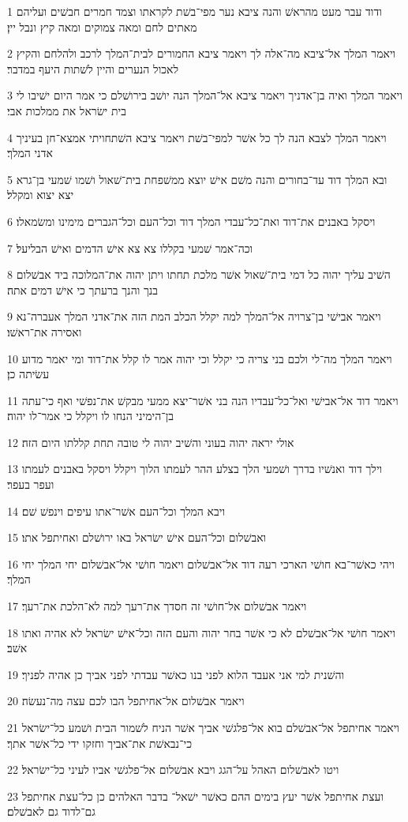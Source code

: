 \par 1 ודוד עבר מעט מהראשׁ והנה ציבא נער מפי־בשׁת לקראתו וצמד חמרים חבשׁים ועליהם מאתים לחם ומאה צמוקים ומאה קיץ ונבל יין׃
\par 2 ויאמר המלך אל־ציבא מה־אלה לך ויאמר ציבא החמורים לבית־המלך לרכב ולהלחם והקיץ לאכול הנערים והיין לשׁתות היעף במדבר׃
\par 3 ויאמר המלך ואיה בן־אדניך ויאמר ציבא אל־המלך הנה יושׁב בירושׁלם כי אמר היום ישׁיבו לי בית ישׂראל את ממלכות אבי׃
\par 4 ויאמר המלך לצבא הנה לך כל אשׁר למפי־בשׁת ויאמר ציבא השׁתחויתי אמצא־חן בעיניך אדני המלך׃
\par 5 ובא המלך דוד עד־בחורים והנה משׁם אישׁ יוצא ממשׁפחת בית־שׁאול ושׁמו שׁמעי בן־גרא יצא יצוא ומקלל׃
\par 6 ויסקל באבנים את־דוד ואת־כל־עבדי המלך דוד וכל־העם וכל־הגברים מימינו ומשׂמאלו׃
\par 7 וכה־אמר שׁמעי בקללו צא צא אישׁ הדמים ואישׁ הבליעל׃
\par 8 השׁיב עליך יהוה כל דמי בית־שׁאול אשׁר מלכת תחתו ויתן יהוה את־המלוכה ביד אבשׁלום בנך והנך ברעתך כי אישׁ דמים אתה׃
\par 9 ויאמר אבישׁי בן־צרויה אל־המלך למה יקלל הכלב המת הזה את־אדני המלך אעברה־נא ואסירה את־ראשׁו׃
\par 10 ויאמר המלך מה־לי ולכם בני צריה כי יקלל וכי יהוה אמר לו קלל את־דוד ומי יאמר מדוע עשׂיתה כן׃
\par 11 ויאמר דוד אל־אבישׁי ואל־כל־עבדיו הנה בני אשׁר־יצא ממעי מבקשׁ את־נפשׁי ואף כי־עתה בן־הימיני הנחו לו ויקלל כי אמר־לו יהוה׃
\par 12 אולי יראה יהוה בעוני והשׁיב יהוה לי טובה תחת קללתו היום הזה׃
\par 13 וילך דוד ואנשׁיו בדרך ושׁמעי הלך בצלע ההר לעמתו הלוך ויקלל ויסקל באבנים לעמתו ועפר בעפר׃
\par 14 ויבא המלך וכל־העם אשׁר־אתו עיפים וינפשׁ שׁם׃
\par 15 ואבשׁלום וכל־העם אישׁ ישׂראל באו ירושׁלם ואחיתפל אתו׃
\par 16 ויהי כאשׁר־בא חושׁי הארכי רעה דוד אל־אבשׁלום ויאמר חושׁי אל־אבשׁלום יחי המלך יחי המלך׃
\par 17 ויאמר אבשׁלום אל־חושׁי זה חסדך את־רעך למה לא־הלכת את־רעך׃
\par 18 ויאמר חושׁי אל־אבשׁלם לא כי אשׁר בחר יהוה והעם הזה וכל־אישׁ ישׂראל לא אהיה ואתו אשׁב׃
\par 19 והשׁנית למי אני אעבד הלוא לפני בנו כאשׁר עבדתי לפני אביך כן אהיה לפניך׃
\par 20 ויאמר אבשׁלום אל־אחיתפל הבו לכם עצה מה־נעשׂה׃
\par 21 ויאמר אחיתפל אל־אבשׁלם בוא אל־פלגשׁי אביך אשׁר הניח לשׁמור הבית ושׁמע כל־ישׂראל כי־נבאשׁת את־אביך וחזקו ידי כל־אשׁר אתך׃
\par 22 ויטו לאבשׁלום האהל על־הגג ויבא אבשׁלום אל־פלגשׁי אביו לעיני כל־ישׂראל׃
\par 23 ועצת אחיתפל אשׁר יעץ בימים ההם כאשׁר ישׁאל־ בדבר האלהים כן כל־עצת אחיתפל גם־לדוד גם לאבשׁלם׃

